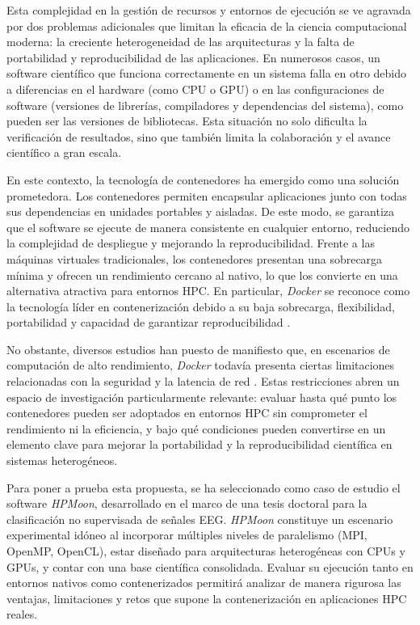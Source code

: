 Esta complejidad en la gestión de recursos y entornos de ejecución se ve agravada por dos problemas adicionales que limitan la eficacia de la ciencia computacional moderna: la creciente heterogeneidad de las arquitecturas y la falta de portabilidad y reproducibilidad de las aplicaciones. En numerosos casos, un software científico que funciona correctamente en un sistema falla en otro debido a diferencias en el hardware (como CPU o GPU) o en las configuraciones de software (versiones de librerías, compiladores y dependencias del sistema), como pueden ser las versiones de bibliotecas. Esta situación no solo dificulta la verificación de resultados, sino que también limita la colaboración y el avance científico a gran escala.

En este contexto, la tecnología de contenedores ha emergido como una solución prometedora. Los contenedores permiten encapsular aplicaciones junto con todas sus dependencias en unidades portables y aisladas. De este modo, se garantiza que el software se ejecute de manera consistente en cualquier entorno, reduciendo la complejidad de despliegue y mejorando la reproducibilidad. Frente a las máquinas virtuales tradicionales, los contenedores presentan una sobrecarga mínima y ofrecen un rendimiento cercano al nativo, lo que los convierte en una alternativa atractiva para entornos \acs{HPC}. En particular, \textit{Docker} se reconoce como la tecnología líder en contenerización debido a su baja sobrecarga, flexibilidad, portabilidad y capacidad de garantizar reproducibilidad \cite{saha2016evaluation}.

No obstante, diversos estudios han puesto de manifiesto que, en escenarios de computación de alto rendimiento, \textit{Docker} todavía presenta ciertas limitaciones relacionadas con la seguridad y la latencia de red \cite{Alles2018AssessingTC, MedranoJaimes2018UseOC}. Estas restricciones abren un espacio de investigación particularmente relevante: evaluar hasta qué punto los contenedores pueden ser adoptados en entornos \acs{HPC} sin comprometer el rendimiento ni la eficiencia, y bajo qué condiciones pueden convertirse en un elemento clave para mejorar la portabilidad y la reproducibilidad científica en sistemas heterogéneos.

Para poner a prueba esta propuesta, se ha seleccionado como caso de estudio el software \textit{HPMoon}, desarrollado en el marco de una tesis doctoral para la clasificación no supervisada de señales \acs{EEG}. \textit{HPMoon} constituye un escenario experimental idóneo al incorporar múltiples niveles de paralelismo (MPI, OpenMP, OpenCL), estar diseñado para arquitecturas heterogéneas con CPUs y GPUs, y contar con una base científica consolidada. Evaluar su ejecución tanto en entornos nativos como contenerizados permitirá analizar de manera rigurosa las ventajas, limitaciones y retos que supone la contenerización en aplicaciones \acs{HPC} reales.

